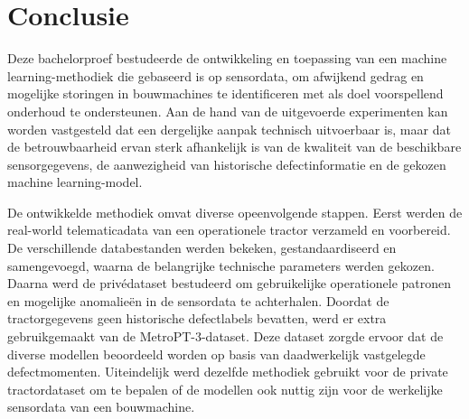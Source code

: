 
\chapter{Conclusie}%
\label{ch:conclusie}


Deze bachelorproef bestudeerde de ontwikkeling en toepassing van een machine learning-methodiek die gebaseerd is op sensordata, om afwijkend gedrag en mogelijke storingen in bouwmachines te identificeren met als doel voorspellend onderhoud te ondersteunen. Aan de hand van de uitgevoerde experimenten kan worden vastgesteld dat een dergelijke aanpak technisch uitvoerbaar is, maar dat de betrouwbaarheid ervan sterk afhankelijk is van de kwaliteit van de beschikbare sensorgegevens, de aanwezigheid van historische defectinformatie en de gekozen machine learning-model.

De ontwikkelde methodiek omvat diverse opeenvolgende stappen. Eerst werden de real-world telematicadata van een operationele tractor verzameld en voorbereid. De verschillende databestanden werden bekeken, gestandaardiseerd en samengevoegd, waarna de belangrijke technische parameters werden gekozen. Daarna werd de privédataset bestudeerd om gebruikelijke operationele patronen en mogelijke anomalieën in de sensordata te achterhalen. Doordat de tractorgegevens geen historische defectlabels bevatten, werd er extra gebruikgemaakt van de Metro\-PT-3-dataset. Deze dataset zorgde ervoor dat de diverse modellen beoordeeld worden op basis van daadwerkelijk vastgelegde defectmomenten. Uiteindelijk wer\-d dezelfde methodiek gebruikt voor de private tractordataset om te bepalen of de modellen ook nuttig zijn voor de werkelijke sensordata van een bouwmachine.

